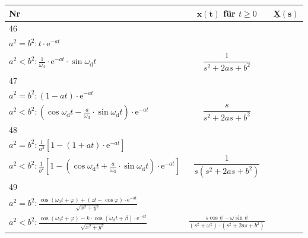 \begin{minipage}{0.68\columnwidth}
	\renewcommand{\arraystretch}{1.7}
	\begin{tabularx}{\columnwidth}{|l|c|X|}
		\hline Nr  & $\mathbf{x(t)}$ für $t \geq 0$ & $\mathbf{\underline{X}(s)}$ \\
		\hline 46  & \begin{tabular}{l}
			\begin{tabular}{l}
				$a^2>b^2: \frac{1}{2 W} \cdot\left(\mathrm{e}^{\lambda_1 t}-\mathrm{e}^{\lambda_2 t}\right)$ \\
				$a^2=b^2: t \cdot \mathrm{e}^{-a t}$ \\
				$a^2<b^2: \frac{1}{\omega_d} \cdot \mathrm{e}^{-a t} \cdot \sin \omega_{\mathrm{d}} t$
			\end{tabular}
		\end{tabular} & $\dfrac{1}{s^2+2 a s+b^2}$\\
		\hline 47   & \begin{tabular}{l}
			\begin{tabular}{l}
				$a^2>b^2: \frac{1}{2 W} \cdot\left(\lambda_1 \mathrm{e}^{\lambda_1 t}-\lambda_2 \mathrm{e}^{\lambda_2 t}\right)$ \\
				$a^2=b^2:(1-a t) \cdot \mathrm{e}^{-a t}$ \\
				$a^2<b^2:\left(\cos \omega_{\mathrm{d}} t-\frac{a}{\omega_{\mathrm{d}}} \cdot \sin \omega_{\mathrm{d}} t\right) \cdot \mathrm{e}^{-a t}$
			\end{tabular}
		\end{tabular} & 
			$\dfrac{s}{s^2+2 a s+b^2}$ \\
		\hline 48 & \begin{tabular}{l}
			\begin{tabular}{l}
				$a^2>b^2: \frac{1}{b^2}\left(1+\frac{\lambda_2}{2 W} \cdot \mathrm{e}^{\lambda_1 t}-\frac{\lambda_1}{2 W} \cdot \mathrm{e}^{\lambda_2 t}\right)$ \\
				$a^2=b^2: \frac{1}{a^2}\left[1-(1+a t) \cdot \mathrm{e}^{-a t}\right]$ \\
				$a^2<b^2: \frac{1}{b^2}\left[1-\left(\cos \omega_{\mathrm{d}} t+\frac{a}{\omega_{\mathrm{d}}} \cdot \sin \omega_{\mathrm{d}} t\right) \cdot \mathrm{e}^{-a t}\right]$
			\end{tabular}
		\end{tabular} & 
			$\dfrac{1}{s\left(s^2+2 a s+b^2\right)}$
		 \\
		\hline 49 &
			\begin{tabular}{l}
				$a^2>b^2: \frac{\cos (\omega_0 t+\varphi)+k_1 \cdot \mathrm{e}^{-\lambda_1 t}+k_2 \cdot \mathrm{e}^{-\lambda_2 t}}{\sqrt{x^2+y^2}}$ \\
				$a^2=b^2: \frac{\cos (\omega_0 t+\varphi)+(z t-\cos \varphi) \cdot \mathrm{e}^{-a t}}{\sqrt{x^2+y^2}}$ \\
				$a^2<b^2: \frac{\cos (\omega_0 t+\varphi)-k \cdot \cos \left(\omega_{\mathrm{d}} t+\beta\right) \cdot \mathrm{e}^{-a t}}{\sqrt{x^2+y^2}}$
			\end{tabular}
		 & 
			$\frac{s \cos \psi-\omega \sin \psi}{\left(s^2+\omega^2\right) \cdot\left(s^2+2 a s+b^2\right)}$
		\\
		\hline
	\end{tabularx}
\end{minipage}

